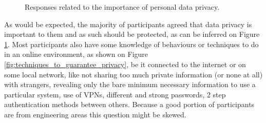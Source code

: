 \begin{figure}
    \begin{center}
        \caption{Responses related to the importance of personal data privacy.}
        \label{fig:privacy_is_important_to_me}
    \end{center}
\end{figure}

As would be expected, the majority of participants agreed that data privacy
is important to them and as such should be protected, as can be inferred
on Figure \ref*{fig:privacy_is_important_to_me}. Most participants
also have some knowledge of behaviours or techniques to do
in an online environment, as shown on Figure \ref*{fig:techniques_to_guarantee_privacy}, be it connected to the internet or on some
local network, like not sharing too much private information
(or none at all) with strangers, revealing only the bare minimum necessary
information to use a particular system, use of VPNs, different and strong
passwords, 2 step authentication methods between others. Because a good
portion of participants are from engineering areas this question might be
skewed.

